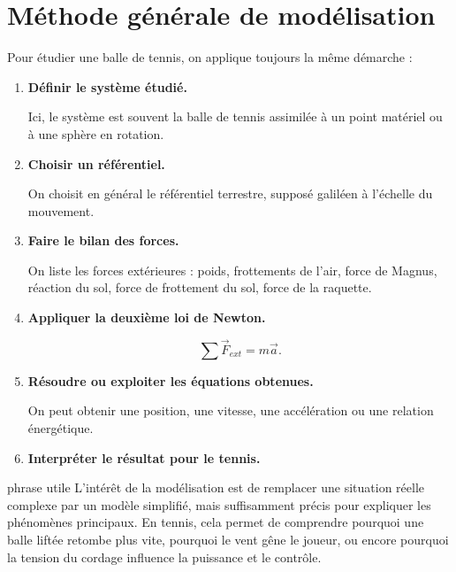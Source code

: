 \documentclass[11pt,a4paper]{article}
\begin{document}
\section{Méthode générale de modélisation}

Pour étudier une balle de tennis, on applique toujours la même démarche :

\begin{enumerate}
    \item \textbf{Définir le système étudié.}
    
    Ici, le système est souvent la balle de tennis assimilée à un point matériel ou à une sphère en rotation.
    
    \item \textbf{Choisir un référentiel.}
    
    On choisit en général le référentiel terrestre, supposé galiléen à l'échelle du mouvement.
    
    \item \textbf{Faire le bilan des forces.}
    
    On liste les forces extérieures : poids, frottements de l'air, force de Magnus, réaction du sol, force de frottement du sol, force de la raquette.
    
    \item \textbf{Appliquer la deuxième loi de Newton.}
    
    \[
    \sum \vec{F}_{ext}=m\vec{a}.
    \]
    
    \item \textbf{Résoudre ou exploiter les équations obtenues.}
    
    On peut obtenir une position, une vitesse, une accélération ou une relation énergétique.
    
    \item \textbf{Interpréter le résultat pour le tennis.}
\end{enumerate}

\begin{oral}{phrase utile}
L'intérêt de la modélisation est de remplacer une situation réelle complexe par un modèle simplifié, mais suffisamment précis pour expliquer les phénomènes principaux. En tennis, cela permet de comprendre pourquoi une balle liftée retombe plus vite, pourquoi le vent gêne le joueur, ou encore pourquoi la tension du cordage influence la puissance et le contrôle.
\end{oral}

\end{document}
